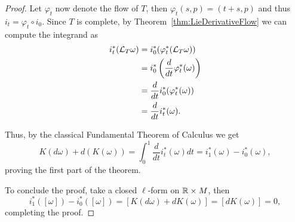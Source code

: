 \begin{proof}
	Let $\varphi_t$ now denote the flow of $T$, then $\varphi_t(s, p) = (t+s, p)$ and thus $i_t = \varphi_t \circ i_0$.
	Since $T$ is complete, by Theorem~\ref{thm:LieDerivativeFlow} we can compute the integrand as
	\begin{align}
		i_t^*(\mathcal{L}_T\omega) & = i^*_0(\varphi_t^*(\mathcal{L}_T\omega))                    \\
		                   & = i_0^*\left(\frac{d}{dt} \varphi_t^*(\omega)\right) \\
		                   & = \frac{d}{dt} i_0^*(\varphi_t^*(\omega))            \\
		                   & = \frac{d}{dt} i_t^*(\omega).
	\end{align}

	Thus, by the classical Fundamental Theorem of Calculus we get
	\begin{equation}
		K(d\omega) + d(K(\omega)) = \int_0^1 \frac{d}{dt} i_t^*(\omega) dt = i_1^*(\omega) - i_0^*(\omega),
	\end{equation}
	proving the first part of the theorem.

	To conclude the proof, take a closed $\ell$-form on $\mathbb{R}\times M$, then
	\begin{equation}
		i_1^*([\omega]) - i_0^*([\omega]) = [K(d\omega) + dK(\omega)] = [dK(\omega)] =0,
	\end{equation}
	completing the proof.
\end{proof}

